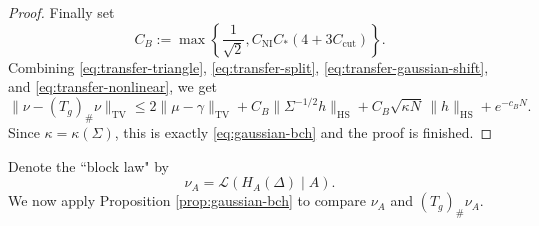 \documentclass[11pt, reqno]{amsart}
\numberwithin{equation}{section}
\theoremstyle{remark}
\newcommand{\1}{\mathbf{1}}
\newcommand{\HS}{\mathrm{HS}}
\newcommand{\Law}{\mathcal{L}}
\newcommand{\TV}{\mathrm{TV}}
\begin{document}
\begin{proof}
Finally set
\[
C_B:=
\max\left\{
\frac1{\sqrt2},
C_{\mathrm{NI}}C_\ast(4+3C_{\mathrm{cut}})
\right\}.
\]
Combining \eqref{eq:transfer-triangle}, \eqref{eq:transfer-split},
\eqref{eq:transfer-gaussian-shift}, and \eqref{eq:transfer-nonlinear}, we get
\[
\|\nu-(T_g)_\#\nu\|_{\TV}
\le
2\|\mu-\gamma\|_{\TV}
+
C_B\|\Sigma^{-1/2}h\|_{\HS}
+
C_B\sqrt{\kappa N}\,\|h\|_{\HS}
+
e^{-c_BN}.
\]
Since \(\kappa=\kappa(\Sigma)\), this is exactly \eqref{eq:gaussian-bch} and the proof is finished.
\end{proof}

Denote the ``block law" by
\begin{equation}
\label{eq:nuA-def}
\nu_A=\Law(H_A(\Delta)\mid A).
\end{equation}
We now apply Proposition \ref{prop:gaussian-bch} to compare $\nu_A$ and $(T_g)_\#\nu_A$.
\end{document}
